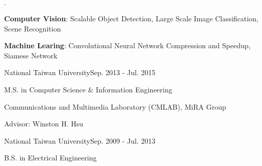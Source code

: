 \documentclass{joel_cv}
\begin{document}
\begin{cvHeader} 
\end{cvHeader}

%
%

\begin{sectionItemize}{$\cdot$}
	\item \textbf{Computer Vision}: 
	Scalable Object Detection, Large Scale Image Classification, Scene Recognition
	\item \textbf{Machine Learing}: 
	Convolutional Neural Network Compression and Speedup, Siamese Network
\end{sectionItemize}

%
%

\begin{sectionContentSimple}{National Taiwan University}{Sep. 2013 - Jul. 2015}
	\item M.S. in Computer Science \& Information Engineering
	\item Communications and Multimedia Laboratory (CMLAB), MiRA Group
	\item Advisor: Winston H. Hsu
\end{sectionContentSimple}

\begin{sectionContentSimple}{National Taiwan University}{Sep. 2009 - Jul. 2013}
	\item B.S. in Electrical Engineering
\end{sectionContentSimple}


%
%
\end{document}
